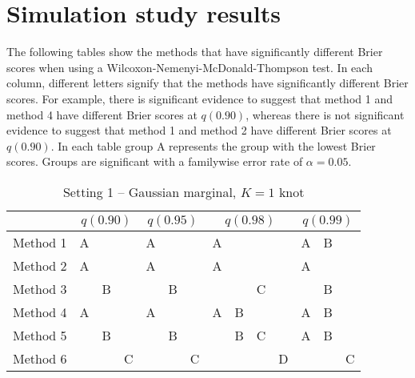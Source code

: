 \section{Simulation study results} \label{sta:pdiffs}
The following tables show the methods that have significantly different Brier scores when using a Wilcoxon-Nemenyi-McDonald-Thompson test.
In each column, different letters signify that the methods have significantly different Brier scores.
For example, there is significant evidence to suggest that method 1 and method 4 have different Brier scores at $q(0.90)$, whereas there is not significant evidence to suggest that method 1 and method 2 have different Brier scores at $q(0.90)$.
In each table group A represents the group with the lowest Brier scores.
Groups are significant with a familywise error rate of $\alpha = 0.05$.

\begin{table}[htbp]
  \centering
  \caption{Setting 1 -- Gaussian marginal, $K = 1$ knot}
  \label{sttbl:gaussim}
  \begin{tabular}{|l|ccc|ccc|cccc|ccc|}
    \cline{2-14}
    \multicolumn{1}{c}{} & \multicolumn{3}{|c}{$q(0.90)$} & \multicolumn{3}{|c}{$q(0.95)$} & \multicolumn{4}{|c}{$q(0.98)$} & \multicolumn{3}{|c|}{$q(0.99)$} \\
    \hline
    Method 1 & A &   &   & A &   &   & A &   &   &   & A & B &   \\
    \hline
    Method 2 & A &   &   & A &   &   & A &   &   &   & A &   &   \\
    \hline
    Method 3 &   & B &   &   & B &   &   &   & C &   &   & B &   \\
    \hline
    Method 4 & A &   &   & A &   &   & A & B &   &   & A & B &   \\
    \hline
    Method 5 &   & B &   &   & B &   &   & B & C &   & A & B &   \\
    \hline
    Method 6 &   &   & C &   &   & C &   &   &   & D &   &   & C \\
    \hline
  \end{tabular}
\end{table}

